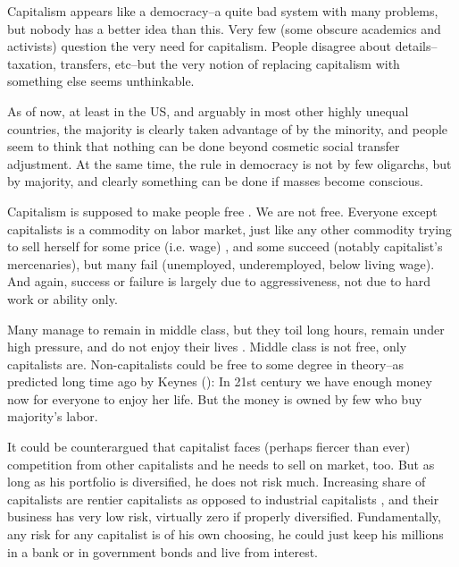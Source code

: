 \documentclass[11pt, letterpaper]{article}
\begin{document}
\begin{spacing}{2.0}
Capitalism appears like a democracy--a quite bad system with many problems, but
 nobody has a better idea than this. Very few (some obscure
academics and activists) question the very need for capitalism.
 People disagree about details--taxation, transfers, etc--but the very notion of
 replacing capitalism with something else seems unthinkable. %


  As of now, at least in the US, and arguably in most other highly unequal
  countries, the majority is clearly taken advantage of by the minority, and  people seem to think that nothing can
  be done beyond cosmetic social transfer adjustment. At the same time, the rule
  in democracy 
  is not by few oligarchs, but by majority,  and clearly something can be done if masses become conscious.

Capitalism is supposed to make people free \citep{hayek14}. 
 We are not free. Everyone except capitalists is a
commodity on labor market, just like any other commodity trying to sell herself for some price (i.e. wage) \citep{esping90, scruggs06Ba}, and some succeed
(notably capitalist's mercenaries), but many fail (unemployed, underemployed, below living wage).  And again, success or
failure is largely due to aggressiveness, not due to hard work or ability only. 

Many manage to remain in middle class, but they
toil long hours, remain under high pressure, and do not enjoy their lives %
\citep{fischer96,coote10,schor08,cha13}. Middle class is not free, only
capitalists are.  Non-capitalists could be
free to some degree in theory--as predicted long time ago by Keynes (\citeyear{keynes30}): In 21st century we have enough money now for
everyone to enjoy her life. But the money is owned by few who buy majority's
labor. 

It could be
counterargued that capitalist faces (perhaps fiercer than ever) competition from other capitalists and he
needs to sell on market, too. But as long as his portfolio is diversified, he
does not risk much. Increasing share of capitalists are rentier capitalists as
opposed to industrial capitalists \citep{harvey14}, and their business has very
low risk, virtually zero if properly diversified. Fundamentally, any risk for
any capitalist is of his own choosing, he could just
keep his millions in a bank or in government bonds and live from
interest. 


\end{spacing}
\end{document}
